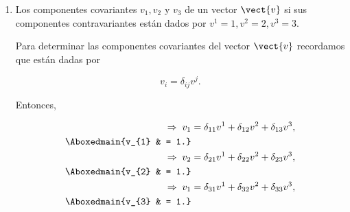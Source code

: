 \documentclass[../main.tex]{subfiles}
\begin{document}
\begin{problema}
\begin{enumerate}
		\item Los componentes covariantes \(v_{1}, v_{2}\) y \(v_{3}\) de un vector
		      \(\vect{v}\) si sus componentes contravariantes están dados por
		      \(v^{1} = 1, v^{2} = 2, v^{3} = 3\).

		      \startsolution

		      Para determinar las componentes covariantes del vector \(\vect{v}\)
		      recordamos que están dadas por

		      \begin{equation*}
			      v_{i} = \delta_{ij}v^{j}.
		      \end{equation*}

		      Entonces,

		      \begin{align*}
			      \Rightarrow\; v_{1} & = \delta_{11}v^{1} + \delta_{12}v^{2} + \delta_{13}v^{3}, \\
			      \Aboxedmain{v_{1}   & = 1.}                                                     \\
			      \Rightarrow\; v_{2} & = \delta_{21}v^{1} + \delta_{22}v^{2} + \delta_{23}v^{3}, \\
			      \Aboxedmain{v_{2}   & = 1.}                                                     \\
			      \Rightarrow\; v_{1} & = \delta_{31}v^{1} + \delta_{32}v^{2} + \delta_{33}v^{3}, \\
			      \Aboxedmain{v_{3}   & = 1.}
		      \end{align*}
	\end{enumerate}
\end{problema}
\end{document}
